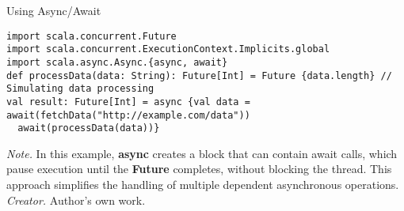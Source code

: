\begin{table}[h!]
\caption{Using Async/Await}
\begin{lstlisting}
import scala.concurrent.Future
import scala.concurrent.ExecutionContext.Implicits.global
import scala.async.Async.{async, await}
def processData(data: String): Future[Int] = Future {data.length} // Simulating data processing
val result: Future[Int] = async {val data = await(fetchData("http://example.com/data"))
  await(processData(data))}
\end{lstlisting}
\small
\textit{Note.} In this example, \textbf{async} creates a block that can contain await calls, which pause execution until the \textbf{Future} completes, without blocking the thread. This approach simplifies the handling of multiple dependent asynchronous operations.
\textit{Creator.} Author's own work.
\end{table}